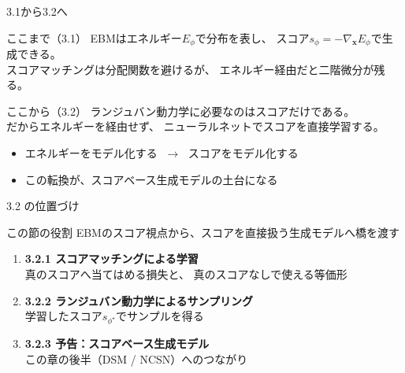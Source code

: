 ﻿%


\begin{frame}{3.1から3.2へ}
    \begin{block}{ここまで（3.1）}
        EBMはエネルギー$E_\phi$で分布を表し、
        スコア$s_\phi=-\nabla_{\bm{x}}E_\phi$で生成できる。\\
        スコアマッチングは分配関数を避けるが、
        エネルギー経由だと二階微分が残る。
    \end{block}
    \begin{block}{ここから（3.2）}
        ランジュバン動力学に必要なのはスコアだけである。\\
        だからエネルギーを経由せず、
        ニューラルネットでスコアを直接学習する。
    \end{block}
    \begin{itemize}
        \item エネルギーをモデル化する $\;\to\;$ スコアをモデル化する
        \item この転換が、スコアベース生成モデルの土台になる
    \end{itemize}
\end{frame}
\asmain
\begin{frame}{3.2 の位置づけ}
    \begin{block}{この節の役割}
        EBMのスコア視点から、スコアを直接扱う生成モデルへ橋を渡す
    \end{block}
    \begin{enumerate}
        \item \textbf{3.2.1 スコアマッチングによる学習}\\
        真のスコアへ当てはめる損失と、
        真のスコアなしで使える等価形
        \item \textbf{3.2.2 ランジュバン動力学によるサンプリング}\\
        学習したスコア$s_{\phi^\star}$でサンプルを得る
        \item \textbf{3.2.3 予告：スコアベース生成モデル}\\
        この章の後半（DSM / NCSN）へのつながり
    \end{enumerate}
\end{frame}
